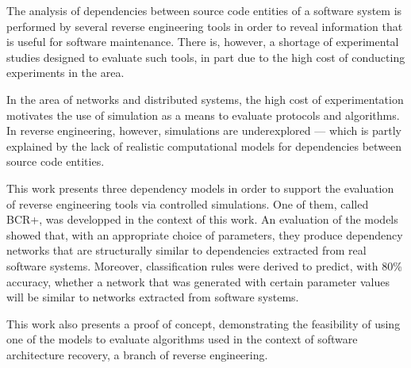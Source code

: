 
The analysis of dependencies between source code entities of a software system is performed by several reverse engineering tools in order to reveal information that is useful for software maintenance. There is, however, a shortage of experimental studies designed to evaluate such tools, in part due to the high cost of conducting experiments in the area.

In the area of networks and distributed systems, the high cost of experimentation motivates the use of simulation as a means to evaluate protocols and algorithms. In reverse engineering, however, simulations are underexplored --- which is partly explained by the lack of realistic computational models for dependencies between source code entities.

This work presents three dependency models in order to support the evaluation of reverse engineering tools via controlled simulations. One of them, called BCR+, was developped in the context of this work. An evaluation of the models showed that, with an appropriate choice of parameters, they produce dependency networks that are structurally similar to dependencies extracted from real software systems. Moreover, classification rules were derived to predict, with 80\% accuracy, whether a network that was generated with certain parameter values will be similar to networks extracted from software systems.

This work also presents a proof of concept, demonstrating the feasibility of using one of the models to evaluate algorithms used in the context of software architecture recovery, a branch of reverse engineering.
